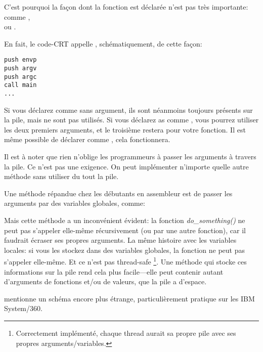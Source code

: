 \par
C'est pourquoi la façon dont la fonction \main est déclarée n'est pas très importante:
comme \main, \\ ou .

En fait, le code-\ac{CRT} appelle \main, schématiquement, de cette façon:
	
\begin{lstlisting}[style=customasmx86]
push envp
push argv
push argc
call main
...
\end{lstlisting}

Si vous déclarez \main comme \main sans argument, ils sont néanmoins toujours présents
sur la pile, mais ne sont pas utilisés.
Si vous déclarez \main as comme ,
vous pourrez utiliser les deux premiers arguments, et le troisième restera 
pour votre fonction.
Il est même possible de déclarer \main comme , cela fonctionnera.


Il est à noter que rien n'oblige les programmeurs à passer les arguments à travers
la pile. Ce n'est pas une exigence.
On peut implémenter n'importe quelle autre méthode sans utiliser du tout la pile.

Une méthode répandue chez les débutants en assembleur est de passer les arguments
par des variables globales, comme:



Mais cette méthode a un inconvénient évident: la fonction \emph{do\_something()}
ne peut pas s'appeler elle-même récursivement (ou par une autre fonction),
car il faudrait écraser ses propres arguments.
La même histoire avec les variables locales: si vous les stockez dans des variables
globales, la fonction ne peut pas s'appeler elle-même.
Et ce n'est pas thread-safe
\footnote{Correctement implémenté, chaque thread aurait sa propre pile avec ses propres arguments/variables.}.
Une méthode qui stocke ces informations sur la pile rend cela plus facile---elle
peut contenir autant d'arguments de fonctions et/ou de valeurs, que la pile a d'espace.

 mentionne un schéma encore plus étrange, particulièrement
pratique sur les IBM System/360.


